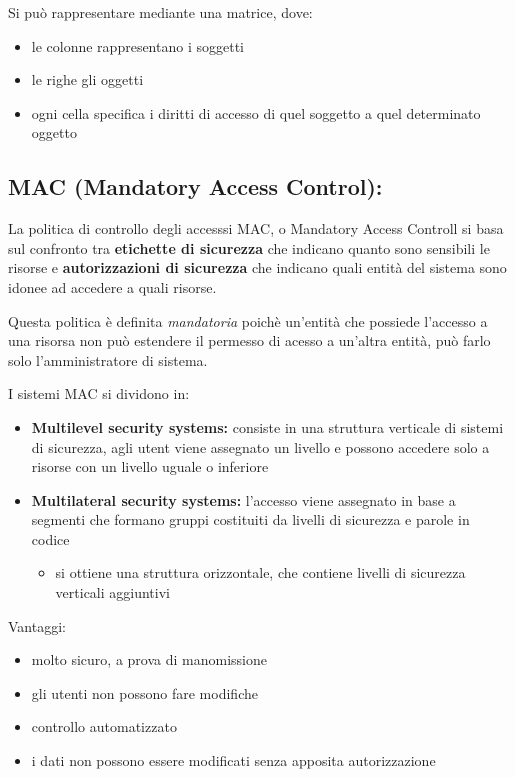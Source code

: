 \documentclass{report}
\begin{document}
\noindent Si può rappresentare mediante una matrice, dove:
\begin{itemize}
    \item le colonne rappresentano i soggetti
    \item le righe gli oggetti
    \item ogni cella specifica i diritti di accesso di quel soggetto a quel determinato oggetto
\end{itemize}


\subsection{MAC (Mandatory Access Control):} 
La politica di controllo degli accesssi MAC, o Mandatory Access Controll si basa sul confronto tra \textbf{etichette di sicurezza} che indicano quanto sono sensibili le risorse
e \textbf{autorizzazioni di sicurezza} che indicano quali entità del sistema sono idonee ad accedere a quali risorse.

\noindent Questa politica è definita \textit{mandatoria} poichè un'entità che possiede l'accesso a una risorsa non può estendere il permesso di acesso a un'altra entità,
può farlo solo l'amministratore di sistema.

\noindent I sistemi MAC si dividono in:
\begin{itemize}
    \item \textbf{Multilevel security systems:} consiste in una struttura verticale di sistemi di sicurezza, agli utent viene assegnato un livello e possono accedere solo a risorse con un livello uguale o inferiore
    \item \textbf{Multilateral security systems:} l'accesso viene assegnato in base a segmenti che formano gruppi costituiti da livelli di sicurezza e parole in codice
    \begin{itemize}
        \item si ottiene una struttura orizzontale, che contiene livelli di sicurezza verticali aggiuntivi
    \end{itemize}
\end{itemize}

\noindent Vantaggi:
\begin{itemize}
    \item molto sicuro, a prova di manomissione
    \item gli utenti non possono fare modifiche
    \item controllo automatizzato
    \item i dati non possono essere modificati senza apposita autorizzazione
\end{itemize}
\end{document}

